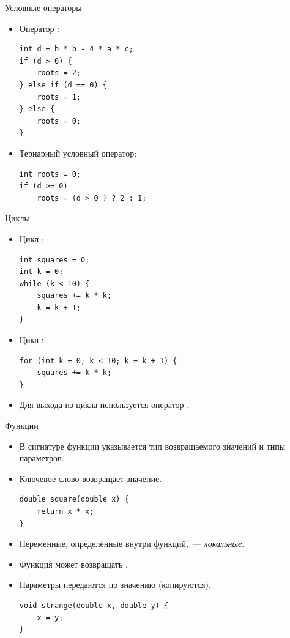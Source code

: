 \documentclass[aspectration=1610,t]{beamer}
\begin{document}
\begin{frame}[fragile]{Условные операторы}
    \begin{itemize}    
        \item Оператор :
            \begin{lstlisting}
int d = b * b - 4 * a * c;
if (d > 0) {
    roots = 2;
} else if (d == 0) {  
    roots = 1;
} else {
    roots = 0;
}
            \end{lstlisting}
        \item Тернарный условный оператор:
            \begin{lstlisting}
int roots = 0;
if (d >= 0)
    roots = (d > 0 ) ? 2 : 1;
            \end{lstlisting}
    \end{itemize}
\end{frame}

\begin{frame}[fragile]{Циклы}
    \begin{itemize}    
        \item Цикл :
            \begin{lstlisting}
int squares = 0;
int k = 0; 
while (k < 10) {
    squares += k * k;
    k = k + 1;
} 
            \end{lstlisting}

        \item Цикл :
            \begin{lstlisting}
for (int k = 0; k < 10; k = k + 1) {
    squares += k * k;
} 
            \end{lstlisting}
        \item Для выхода из цикла используется оператор .
    \end{itemize}
\end{frame}

\begin{frame}[fragile]{Функции}
    \begin{itemize}
        \item В сигнатуре функции указывается тип возвращаемого значений и типы параметров.
        \item Ключевое слово  возвращает значение.
            \begin{lstlisting}
double square(double x) {
    return x * x;
}
            \end{lstlisting}
        \item Переменные, определённые внутри функций,~— {\em локальные}.
        \item Функция может возвращать .
        \item Параметры передаются по значению (копируются).
            \begin{lstlisting}
void strange(double x, double y) {
    x = y;
}
            \end{lstlisting}
    \end{itemize}
\end{frame}
\end{document}
